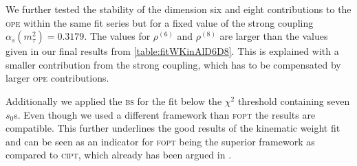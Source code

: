 \documentclass[../../index.tex]{subfiles}
\begin{document}
We further tested the stability of the dimension six and eight contributions to
the \textsc{ope} within the same fit series but for a fixed value of the strong
coupling \(\alpha_s(m_\tau^2)=0.3179\). The values for \(\rho^{(6)}\) and
\(\rho^{(8)}\) are larger than the values given in our final results from
\cref{table:fitWKinAlD6D8}. This is explained with a smaller contribution from
the strong coupling, which has to be compensated by larger \textsc{ope}
contributions.

Additionally we applied the \textsc{bs} for the fit below the \(\chi^2\)
threshold containing seven \(s_0\)s. Even though we used a different framework
than \textsc{fopt} the results are compatible. This further underlines the good
results of the kinematic weight fit and can be seen as an indicator for
\textsc{fopt} being the superior framework as compared to \textsc{cipt}, which
already has been argued in \cite{Beneke2008}.
\end{document}
